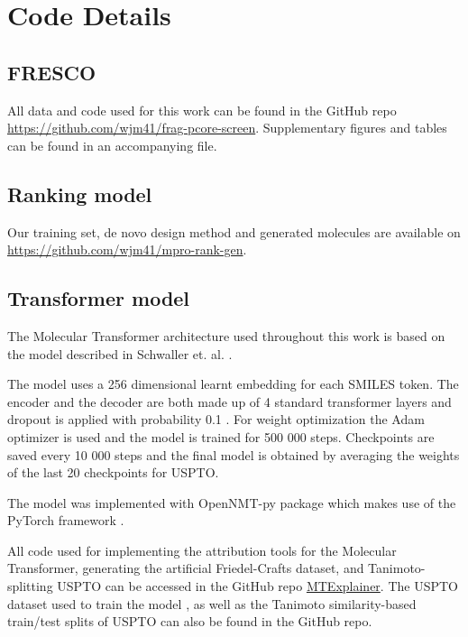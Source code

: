 \chapter{Code Details} \label{appendix:details}

\section{FRESCO}
All data and code used for this work can be found in the GitHub repo \url{https://github.com/wjm41/frag-pcore-screen}. Supplementary figures and tables can be found in an accompanying file.

\section{Ranking model}
Our training set, de novo design method and generated molecules are available on \url{https://github.com/wjm41/mpro-rank-gen}.

\section{Transformer model}
The Molecular Transformer architecture used throughout this work is based on the model described in Schwaller et. al. \cite{Schwaller2019MolecularPrediction}. 

The model uses a 256 dimensional learnt embedding for each SMILES token. The encoder and the decoder are both made up of 4 standard transformer layers and dropout is applied with probability 0.1 \cite{Srivastava2014Dropout:Overfittin}. For weight optimization the Adam optimizer is used and the model is trained for 500 000 steps. Checkpoints are saved every 10 000 steps and the final model is obtained by averaging the weights of the last 20 checkpoints for USPTO.

The model was implemented with OpenNMT-py package \cite{Klein2017} which makes use of the PyTorch framework \cite{Paszke2019PyTorch:Library}. 

All code used for implementing the attribution tools for the Molecular Transformer, generating the artificial Friedel-Crafts dataset, and Tanimoto-splitting USPTO can be accessed in the GitHub repo \href{https://github.com/davkovacs/MTExplainer.git}{MTExplainer}\cite{Kovacs2020MolecularExplainer}. The USPTO dataset used to train the model \cite{Lowe2012, Jin2017}, as well as the Tanimoto similarity-based train/test splits of USPTO can also be found in the GitHub repo.